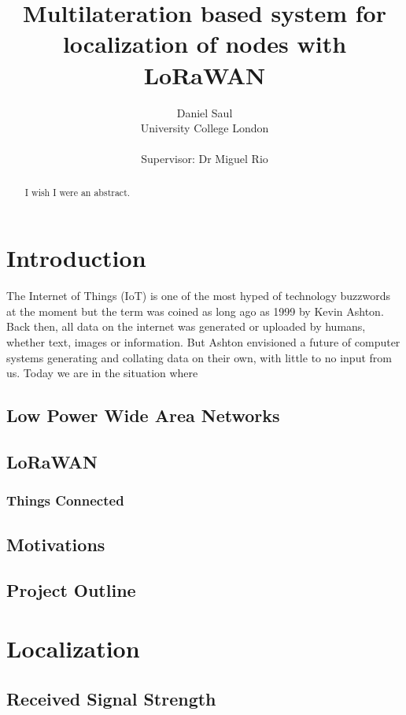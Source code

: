\documentclass[a4paper]{report}
\title{Multilateration based system for localization of nodes with LoRaWAN}
\author{Daniel Saul\\University College London\\ \\Supervisor: Dr Miguel Rio}
\begin{document}
    \maketitle

\pagestyle{fancy}

\begin{abstract}
    I wish I were an abstract.
\end{abstract}

\tableofcontents


\chapter{Introduction}

  The Internet of Things (IoT) is one of the most hyped of technology buzzwords at the moment but the term was coined as long ago as 1999 by Kevin Ashton. Back then, all data on the internet was generated or uploaded by humans, whether text, images or information. But Ashton envisioned a future of computer systems generating and collating data on their own, with little to no input from us. Today we are in the situation where

  \section{Low Power Wide Area Networks}

  \section{LoRaWAN}
    \subsection{Things Connected}

  \section{Motivations}

  \section{Project Outline}

\chapter{Localization}

  \section{Received Signal Strength}
\end{document}
